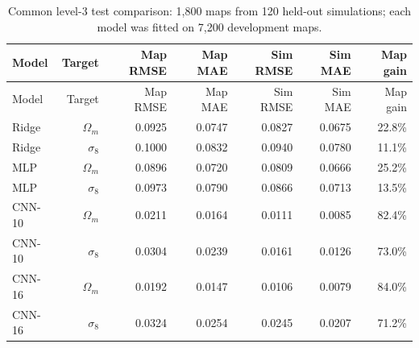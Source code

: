 \begingroup\footnotesize\setlength{\tabcolsep}{3pt}\renewcommand{\arraystretch}{1.05}
\begin{longtable}{lrrrrrr}
\caption{Common level-3 test comparison: 1,800 maps from 120 held-out simulations; each model was fitted on 7,200 development maps.}\label{tab:common}\\
\toprule
Model & Target & Map RMSE & Map MAE & Sim RMSE & Sim MAE & Map gain \\
\midrule
\endfirsthead
\toprule
Model & Target & Map RMSE & Map MAE & Sim RMSE & Sim MAE & Map gain \\
\midrule\endhead
\bottomrule\endfoot
Ridge & $\Omega_m$ & 0.0925 & 0.0747 & 0.0827 & 0.0675 & 22.8\% \\
Ridge & $\sigma_8$ & 0.1000 & 0.0832 & 0.0940 & 0.0780 & 11.1\% \\
MLP & $\Omega_m$ & 0.0896 & 0.0720 & 0.0809 & 0.0666 & 25.2\% \\
MLP & $\sigma_8$ & 0.0973 & 0.0790 & 0.0866 & 0.0713 & 13.5\% \\
CNN-10 & $\Omega_m$ & 0.0211 & 0.0164 & 0.0111 & 0.0085 & 82.4\% \\
CNN-10 & $\sigma_8$ & 0.0304 & 0.0239 & 0.0161 & 0.0126 & 73.0\% \\
CNN-16 & $\Omega_m$ & 0.0192 & 0.0147 & 0.0106 & 0.0079 & 84.0\% \\
CNN-16 & $\sigma_8$ & 0.0324 & 0.0254 & 0.0245 & 0.0207 & 71.2\% \\
\end{longtable}\endgroup
